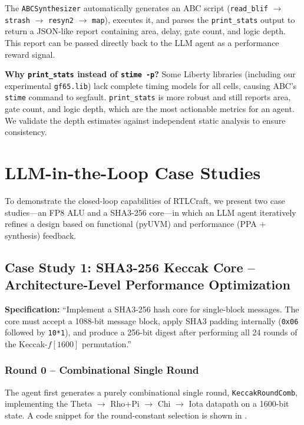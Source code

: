 \documentclass[11pt]{article}
\begin{document}
The \texttt{ABCSynthesizer} automatically generates an ABC script (\texttt{read\_blif} $\rightarrow$ \texttt{strash} $\rightarrow$ \texttt{resyn2} $\rightarrow$ \texttt{map}), executes it, and parses the \texttt{print\_stats} output to return a JSON-like report containing area, delay, gate count, and logic depth. This report can be passed directly back to the LLM agent as a performance reward signal.

\textbf{Why \texttt{print\_stats} instead of \texttt{stime -p}?} Some Liberty libraries (including our experimental \texttt{gf65.lib}) lack complete timing models for all cells, causing ABC's \texttt{stime} command to segfault. \texttt{print\_stats} is more robust and still reports area, gate count, and logic depth, which are the most actionable metrics for an agent. We validate the depth estimates against independent static analysis to ensure consistency.

\section{LLM-in-the-Loop Case Studies}
\label{sec:cases}

To demonstrate the closed-loop capabilities of RTLCraft, we present two case studies---an FP8 ALU and a SHA3-256 core---in which an LLM agent iteratively refines a design based on functional (pyUVM) and performance (PPA + synthesis) feedback.

\subsection{Case Study 1: SHA3-256 Keccak Core -- Architecture-Level Performance Optimization}
\label{sec:case_sha3}

\textbf{Specification:} ``Implement a SHA3-256 hash core for single-block messages. The core must accept a 1088-bit message block, apply SHA3 padding internally (\texttt{0x06} followed by \texttt{10*1}), and produce a 256-bit digest after performing all 24 rounds of the Keccak-$f[1600]$ permutation.''

\subsubsection{Round 0 -- Combinational Single Round}

The agent first generates a purely combinational single round, \texttt{KeccakRoundComb}, implementing the Theta $\rightarrow$ Rho+Pi $\rightarrow$ Chi $\rightarrow$ Iota datapath on a 1600-bit state. A code snippet for the round-constant selection is shown in .
\end{document}

